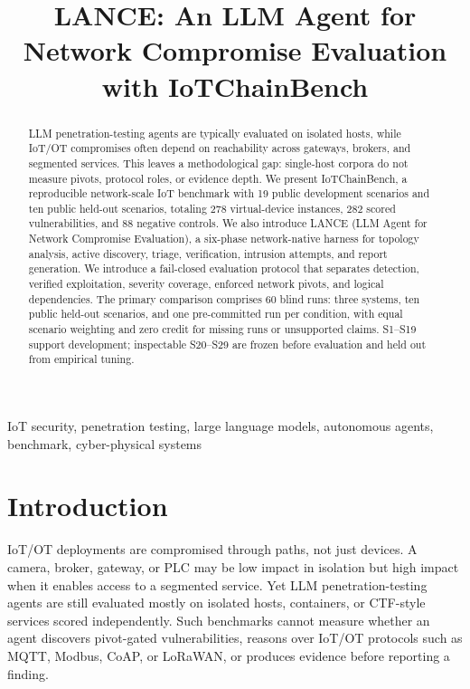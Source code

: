 \documentclass[conference,compsoc]{IEEEtran}
\title{LANCE: An LLM Agent for Network Compromise Evaluation with IoTChainBench}
\author{%
\IEEEauthorblockN{Tanguy Vansnick\IEEEauthorrefmark{1},
Gaspard Menou\IEEEauthorrefmark{2},
Saïd Mahmoudi\IEEEauthorrefmark{1}}
\IEEEauthorblockA{\IEEEauthorrefmark{1}\textit{University of Mons}, Mons, Belgium}
\IEEEauthorblockA{\IEEEauthorrefmark{2}\textit{Centrale Marseille}, Marseille, France}
\IEEEauthorblockA{tanguy.vansnick@umons.ac.be}
}
\newcommand{\systemname}{IoTChainBench\xspace}
\newcommand{\harnessname}{\textsc{LANCE}\xspace}
\begin{document}
\maketitle

\begin{abstract}
LLM penetration-testing agents are typically evaluated on isolated hosts, while
IoT/OT compromises often depend on reachability across gateways, brokers, and
segmented services. This leaves a methodological gap: single-host corpora do not
measure pivots, protocol roles, or evidence depth. We present
\systemname{}, a reproducible network-scale IoT benchmark with 19 public
development scenarios and ten public held-out scenarios, totaling 278
virtual-device instances, 282 scored vulnerabilities, and 88 negative
controls.
We also introduce \harnessname{} (LLM Agent for Network Compromise
Evaluation), a six-phase network-native harness for topology analysis, active
discovery, triage, verification, intrusion attempts, and report generation.
We introduce a fail-closed evaluation protocol that separates detection,
verified exploitation, severity coverage, enforced network pivots, and logical
dependencies. The primary comparison comprises 60 blind runs: three systems,
ten public held-out scenarios, and one pre-committed run per condition, with
equal scenario weighting and zero credit for missing runs or unsupported claims. S1--S19
support development; inspectable S20--S29 are frozen before evaluation and held
out from empirical tuning.
\end{abstract}

\begin{IEEEkeywords}
IoT security, penetration testing, large language models, autonomous agents,
benchmark, cyber-physical systems
\end{IEEEkeywords}

\section{Introduction}
\label{sec:intro}

IoT/OT deployments are compromised through paths, not just devices. A camera, broker, gateway, or PLC may be low impact in isolation but high impact when it enables access to a segmented service. Yet LLM penetration-testing agents are still evaluated mostly on isolated hosts, containers, or CTF-style services scored independently. Such benchmarks cannot measure whether an agent discovers pivot-gated vulnerabilities, reasons over IoT/OT protocols such as MQTT, Modbus, CoAP, or LoRaWAN, or produces evidence before reporting a finding.
\end{document}

